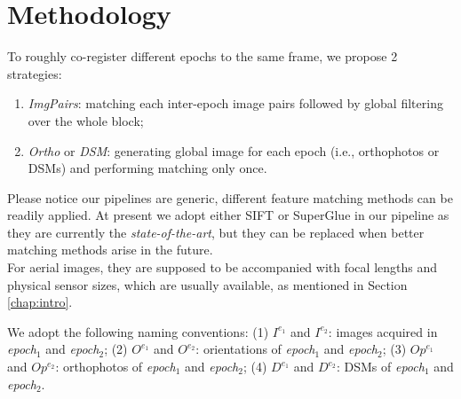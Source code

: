 \section{Methodology}
To roughly co-register different epochs to the same frame, we propose 2 strategies: \\
\begin{enumerate}
	\item \textit{ImgPairs}: matching each inter-epoch image pairs followed by global filtering over the whole block;
	\item \textit{Ortho} or \textit{DSM}: generating global image for each epoch (i.e., orthophotos or \ac{DSM}s) and performing matching only once. 
\end{enumerate}
Please notice our pipelines are generic, different feature matching methods can be readily applied. At present we adopt either SIFT or SuperGlue in our pipeline as they are currently the \textit{state-of-the-art}, but they can be replaced when better matching methods arise in the future.\\
 For aerial images, they are supposed to be accompanied with focal lengths and physical sensor sizes, which are usually available, as mentioned in Section \ref{chap:intro}. 
\par
We adopt the following naming conventions: (1) $I^{e_1}$ and $I^{e_2}$: images acquired in \textit{epoch$_1$} and \textit{epoch$_2$}; (2) $O^{e_1}$ and $O^{e_2}$: orientations of \textit{epoch$_1$} and \textit{epoch$_2$}; (3) $Op^{e_1}$ and $Op^{e_2}$: orthophotos of \textit{epoch$_1$} and \textit{epoch$_2$}; (4) $D^{e_1}$ and $D^{e_2}$: \ac{DSM}s of \textit{epoch$_1$} and \textit{epoch$_2$}.\\
